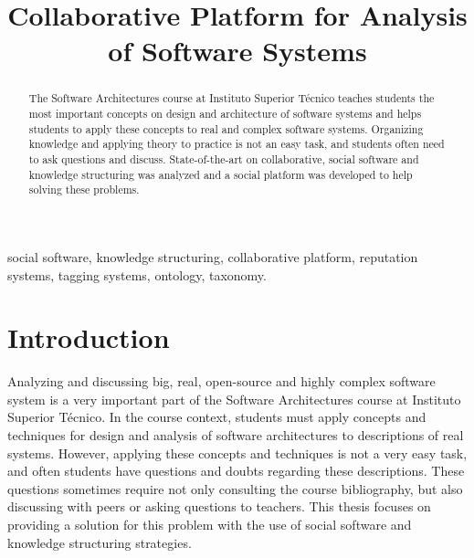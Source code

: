 \documentclass[conference]{IEEEtran}
\begin{document}
%
\title{Collaborative Platform for Analysis of Software Systems}


\author{
}

\maketitle


\begin{abstract}
The Software Architectures course at Instituto Superior T\'{e}cnico teaches students the most important concepts on design and architecture of software systems and helps students to apply these concepts to real and complex software systems. Organizing knowledge and applying theory to practice is not an easy task, and students often need to ask questions and discuss. State-of-the-art on collaborative, social software and knowledge structuring was analyzed and a social platform was developed to help solving these problems.
\end{abstract}

\begin{IEEEkeywords}
social software, knowledge structuring, collaborative platform, reputation systems, tagging systems, ontology, taxonomy.
\end{IEEEkeywords}

\section{Introduction}
\label{introduction}
Analyzing and discussing big, real, open-source and highly complex software system is a very important part of the Software Architectures course at Instituto Superior T\'{e}cnico. In the course context, students must apply concepts and techniques for design and analysis of software architectures to descriptions of real systems. However, applying these concepts and techniques is not a very easy task, and often students have questions and doubts regarding these descriptions. These questions sometimes require not only consulting the course bibliography, but also discussing with peers or asking questions to teachers. This thesis focuses on providing a solution for this problem with the use of social software and knowledge structuring strategies.
\end{document}
